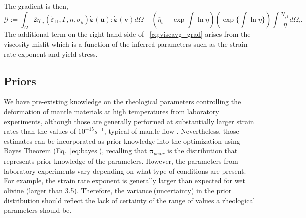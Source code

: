 \documentclass[12pt]{article}
\newcommand{\IIinv}{{\dot\varepsilon}_{\mathrm{\!\!\:II}}}
\newcommand{\uu}{{\ensuremath{\boldsymbol{u}}}}
\newcommand{\vv}{{\ensuremath{\boldsymbol{v}}}}
\newcommand{\ppi}{{\ensuremath{\boldsymbol{\pi}}}}
\newcommand{\strain}{{\ensuremath{\dot{\boldsymbol{\varepsilon}}}}}
\begin{document}
The gradient is then, 
\begin{equation}
\mathcal G:= \int_{\Omega} 2 \eta_{,i}(\IIinv, \Gamma, n, \sigma_y)\strain(\uu):\strain(\vv) d\Omega - (\overline{\eta}_i-\exp\int\ln \eta)(\exp\{\int\ln \eta\})\int\frac{\eta_{,i}}{\eta}d\Omega_i.\
\label{eq:viscavg_grad}
\end{equation}
The additional term on the right hand side of ~\eqref{eq:viscavg_grad} arises from the viscosity misfit which is a function of the inferred parameters such as the strain rate exponent and yield stress.


\subsection*{Priors}
 We have pre-existing knowledge on the rheological parameters controlling the deformation of mantle materials at high temperatures from laboratory experiments\cite{ranalli1995rheology}, 
although those are generally performed at substantially larger strain rates than the values of $10^{-15}s^{-1}$, typical of mantle flow \citep{korenaga2008new}. Nevertheless,  those estimates can be  incorporated as prior knowledge into the optimization using Bayes Theorem (Eq.~\eqref{eq:bayes}), recalling that $\ppi_{prior}$ is the distribution that represents prior knowledge of the parameters. However, the parameters from laboratory experiments vary depending on what type of conditions are present. For example, the strain rate exponent is generally larger than expected  for wet olivine (larger than 3.5). Therefore, the variance (uncertainty) in the prior distribution should reflect the lack of certainty of the range of values a rheological parameters should be.
\end{document}
